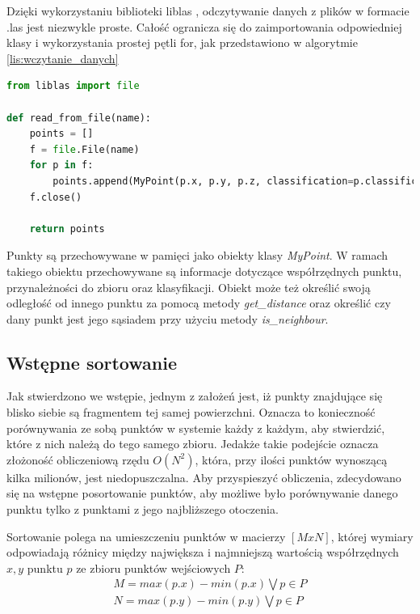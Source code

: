 Dzięki wykorzystaniu biblioteki liblas \cite{website:libLASPython}, odczytywanie danych z plików w formacie .las jest niezwykle proste.
Całość ogranicza się do zaimportowania odpowiedniej klasy i wykorzystania prostej pętli for, jak przedstawiono
w algorytmie \ref{lis:wczytanie_danych}

\begin{lstlisting}[frame=L, language=python, caption={Wczytywanie danych}, label={lis:wczytanie_danych}]
from liblas import file

def read_from_file(name):
    points = []
    f = file.File(name)
    for p in f:
        points.append(MyPoint(p.x, p.y, p.z, classification=p.classification))
    f.close()

    return points
\end{lstlisting}

Punkty są przechowywane w pamięci jako obiekty klasy \textit{MyPoint}. W ramach takiego obiektu przechowywane są informacje dotyczące
współrzędnych punktu, przynależności do zbioru oraz klasyfikacji. Obiekt może też określić swoją odległość od innego punktu
za pomocą metody \textit{get\_distance} oraz określić czy dany punkt jest jego sąsiadem przy użyciu metody \textit{is\_neighbour}.

\subsection{Wstępne sortowanie}
\label{chap:wstepne_sortowanie}

Jak stwierdzono we wstępie, jednym z założeń jest, iż punkty znajdujące się blisko siebie są fragmentem tej samej powierzchni.
Oznacza to konieczność porównywania ze sobą punktów w systemie każdy z każdym, aby stwierdzić, które z nich należą do tego samego zbioru.
Jedakże takie podejście oznacza złożoność obliczeniową rzędu $O(N^2)$, która,  przy ilości punktów wynoszącą kilka milionów, jest niedopuszczalna.
Aby przyspieszyć obliczenia, zdecydowano się na wstępne posortowanie punktów, aby możliwe było porównywanie danego punktu tylko z punktami z 
jego najbliższego otoczenia.

Sortowanie polega na umieszczeniu punktów w macierzy $[M x N]$, której wymiary odpowiadają różnicy między największa i najmniejszą wartością
współrzędnych $x, y$ punktu $p$ ze zbioru punktów wejściowych $P$:
\begin{eqnarray}
    M = max(p.x) - min(p.x) \bigvee p \in P \\
    N = max(p.y) - min(p.y) \bigvee p \in P
\end{eqnarray}

